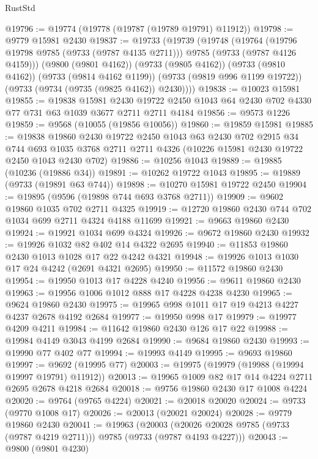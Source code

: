 \begin{lexlean}{RustStd}
\begin{coremodule}
{\begin{coremodule}
{{{{{{{{{{{{{{{{{{{{{{{{{{{{{{{{{{{{{{{{{{{{{{{{{{{{{{{@19796 := @19774 (@19778 (@19787 (@19789 @19791) @11912))
@19798 := @9779 @15981 @2430
@19837 := @19733
    (@19739
      (@19748
        (@19764 (@19796 @19798 @9785 (@9733 (@9787 @4135 @2711))) @9785 (@9733 (@9787 @4126 @4159)))
        (@9800 (@9801 @4162))
        (@9733 (@9805 @4162))
        (@9733 (@9810 @4162))
        (@9733 (@9814 @4162 @1199))
        (@9733 (@9819 @996 @1199 @19722))
        (@9733 (@9734 (@9735 (@9825 @4162)) @2430))))
@19838 := @10023 @15981
@19855 := @19838
    @15981
    @2430
    @19722
    @2450
    @1043
    @64
    @2430
    @702
    @4330
    @77
    @731
    @63
    @1039
    @3677
    @2711
    @2711
    @4184
@19856 := @9573 @1226
@19859 := @9568 (@10055 (@19856 @10056))
@19860 := @19859 @15981
@19885 := @19838
    @19860
    @2430
    @19722
    @2450
    @1043
    @63
    @2430
    @702
    @2915
    @34
    @744
    @693
    @1035
    @3768
    @2711
    @2711
    @4326
    (@10226 @15981 @2430 @19722 @2450 @1043 @2430 @702)
@19886 := @10256 @1043
@19889 := @19885 (@10236 (@19886 @34))
@19891 := @10262 @19722 @1043
@19895 := @19889 (@9733 (@19891 @63 @744))
@19898 := @10270 @15981 @19722 @2450
@19904 := @19895 (@9596 (@19898 @744 @693 @3768 @2711))
@19909 := @9602 @19860 @1035 @702 @2711 @4325
@19919 := @12720 @19860 @2430 @744 @702 @1034 @699 @2711 @4324 @4188 @11699
@19921 := @9663 @19860 @2430
@19924 := @19921 @1034 @699 @4324
@19926 := @9672 @19860 @2430
@19932 := @19926 @1032 @82 @402 @14 @4322 @2695
@19940 := @11853 @19860 @2430 @1013 @1028 @17 @22 @4242 @4321
@19948 := @19926 @1013 @1030 @17 @24 @4242 (@2691 @4321 @2695)
@19950 := @11572 @19860 @2430
@19954 := @19950 @1013 @17 @4228 @4240
@19956 := @9611 @19860 @2430
@19963 := @19956 @1006 @1012 @888 @17 @4228 @4238 @4230
@19965 := @9624 @19860 @2430
@19975 := @19965 @998 @1011 @17 @19 @4213 @4227 @4237 @2678 @4192 @2684
@19977 := @19950 @998 @17
@19979 := @19977 @4209 @4211
@19984 := @11642 @19860 @2430 @126 @17 @22
@19988 := @19984 @4149 @3043 @4199 @2684
@19990 := @9684 @19860 @2430
@19993 := @19990 @77 @402 @77
@19994 := @19993 @4149
@19995 := @9693 @19860
@19997 := @9692 (@19995 @77)
@20003 := @19975 (@19979 (@19988 (@19994 @19997 @19791) @11912))
@20013 := @19965 @1009 @82 @17 @14 @4224 @2711 @2695 @2678 @4218 @2684
@20018 := @9756 @19860 @2430 @17 @1008 @4224
@20020 := @9764 (@9765 @4224)
@20021 := @20018 @20020
@20024 := @9733 (@9770 @1008 @17)
@20026 := @20013 (@20021 @20024)
@20028 := @9779 @19860 @2430
@20041 := @19963
    (@20003 (@20026 @20028 @9785 (@9733 (@9787 @4219 @2711))) @9785 (@9733 (@9787 @4193 @4227)))
@20043 := @9800 (@9801 @4230)
}}}}}}}}}}}}}}}}}}}}}}}}}}}}}}}}}}}}}}}}}}}}}}}}}}}}}}}
\end{coremodule}}
\end{coremodule}
\end{lexlean}
